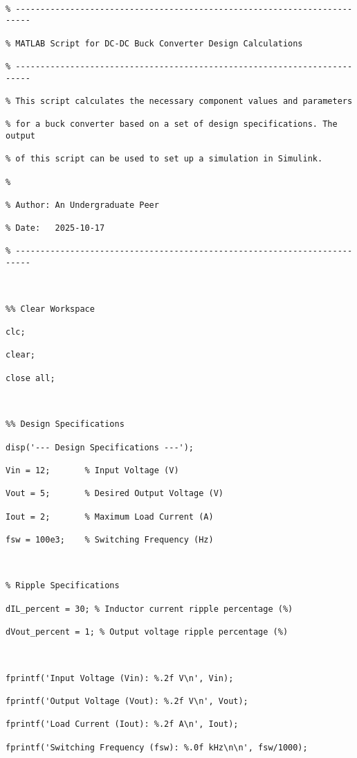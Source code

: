 \documentclass[12pt, a4paper]{article}
\begin{document}
\begin{lstlisting}[caption={MATLAB script for buck converter calculations.}, label={lst:matlab}]

% -------------------------------------------------------------------------

% MATLAB Script for DC-DC Buck Converter Design Calculations

% -------------------------------------------------------------------------

% This script calculates the necessary component values and parameters

% for a buck converter based on a set of design specifications. The output

% of this script can be used to set up a simulation in Simulink.

%

% Author: An Undergraduate Peer

% Date:   2025-10-17

% -------------------------------------------------------------------------



%% Clear Workspace

clc;

clear;

close all;



%% Design Specifications

disp('--- Design Specifications ---');

Vin = 12;       % Input Voltage (V)

Vout = 5;       % Desired Output Voltage (V)

Iout = 2;       % Maximum Load Current (A)

fsw = 100e3;    % Switching Frequency (Hz)



% Ripple Specifications

dIL_percent = 30; % Inductor current ripple percentage (%)

dVout_percent = 1; % Output voltage ripple percentage (%)



fprintf('Input Voltage (Vin): %.2f V\n', Vin);

fprintf('Output Voltage (Vout): %.2f V\n', Vout);

fprintf('Load Current (Iout): %.2f A\n', Iout);

fprintf('Switching Frequency (fsw): %.0f kHz\n\n', fsw/1000);




\end{lstlisting}
\end{document}
